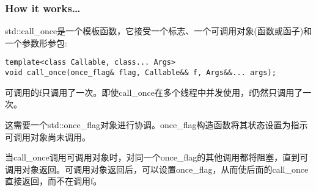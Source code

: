 \subsubsection{How it works…}

std::call\_once是一个模板函数，它接受一个标志、一个可调用对象(函数或函子)和一个参数形参包:

\begin{lstlisting}[style=styleCXX]
template<class Callable, class... Args>
void call_once(once_flag& flag, Callable&& f, Args&&... args);
\end{lstlisting}

可调用的f只调用了一次。即使call\_once在多个线程中并发使用，f仍然只调用了一次。

这需要一个std::once\_flag对象进行协调。once\_flag构造函数将其状态设置为指示可调用对象尚未调用。

当call\_once调用可调用对象时，对同一个once\_flag的其他调用都将阻塞，直到可调用对象返回。可调用对象返回后，可以设置once\_flag，从而使后面的call\_once直接返回，而不在调用f。




















